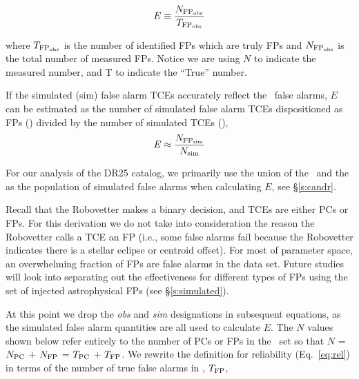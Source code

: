 \begin{equation}
\label{effect1}
E \equiv \frac{N_{\rm FP_{\rm obs}}}{T_{\rm FP_{\rm obs}}}
\end{equation}

\noindent where $T_{\rm FP_{\rm obs}}$ is the number of identified FPs which are truly FPs and $N_{\rm FP_{\rm obs}}$ is the total number of measured FPs. Notice we are using $N$ to indicate the measured number, and T to indicate the ``True'' number. 

If the simulated (sim) false alarm TCEs accurately reflect the \opstce\ false alarms, $E$ can be estimated as the number of simulated false alarm TCEs dispositioned as FPs (\simfp) divided by the number of simulated TCEs (\simN), 
\begin{equation}
\label{effect2}
E \approx  \frac{N_{\rm FP_{\rm sim}}}{N_{\rm sim}}
\end{equation}

\noindent For our analysis of the DR25 catalog, we primarily use the union of the \invtces\ and the \scrtces{} as the population of simulated false alarms when calculating $E$, see \S\ref{s:candr}.


Recall that the Robovetter makes a binary decision, and TCEs are either PCs or FPs. For this derivation we do not take into consideration the reason the Robovetter calls a TCE an FP (i.e., some false alarms fail because the Robovetter indicates there is a stellar eclipse or centroid offset). For most of parameter space, an overwhelming fraction of FPs are false alarms in the \opstce{} data set. Future studies will look into separating out the effectiveness for different types of FPs using the set of injected astrophysical FPs (see \S\ref{s:simulated}).


At this point we drop the \textit{obs} and \textit{sim} designations in subsequent equations, as the simulated false alarm quantities are all used to calculate $E$. The $N$ values shown below refer entirely to the number of PCs or FPs in the \opstce\ set so that $N$ = $N_{\rm PC}$ + $N_{\rm FP}$ = $T_{\rm PC}$ + $T_{\rm FP}$. We rewrite the definition for reliability (Eq.~\ref{eq:rel}) in terms of the number of true false alarms in \opstce, $T_{\rm FP}$,

